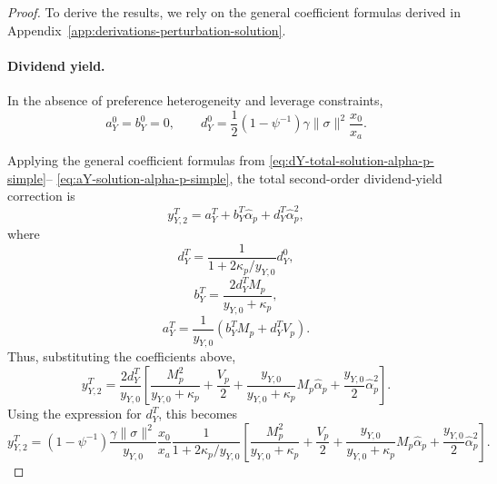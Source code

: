 \begin{proof}
    To derive the results, we rely on the general coefficient formulas derived in Appendix~\ref{app:derivations-perturbation-solution}.
    \paragraph{Dividend yield.}
In the absence of preference heterogeneity and leverage constraints,
\[
a_Y^0=b_Y^0=0,
\qquad
d_Y^0
=
\frac12(1-\psi^{-1})\gamma\|\sigma\|^2\frac{x_0}{x_a}.
\]

Applying the general coefficient formulas from
\eqref{eq:dY-total-solution-alpha-p-simple}--
\eqref{eq:aY-solution-alpha-p-simple},
the total second-order dividend-yield correction is
\[
y_{Y,2}^T
=
a_Y^T+b_Y^T\hat\alpha_p+d_Y^T\hat\alpha_p^2,
\]
where
\[
d_Y^T
=
\frac{1}{1+2\kappa_p/y_{Y,0}}d_Y^0,
\]
\[
b_Y^T
=
\frac{2d_Y^TM_p}{y_{Y,0}+\kappa_p},
\]
\[
a_Y^T
=
\frac{1}{y_{Y,0}}
\left(
b_Y^TM_p+d_Y^TV_p
\right).
\]
Thus, substituting the coefficients above,
\begin{equation}\label{eq:yY2-total-noheterog-closed-form}
    y_{Y,2}^T
    =
    \frac{2d_Y^T}{y_{Y,0}}
    \left[
        \frac{M_p^2}{y_{Y,0}+\kappa_p}
        +\frac{V_p}{2}
        +\frac{y_{Y,0}}{y_{Y,0}+\kappa_p}M_p\hat{\alpha}_p
        +\frac{y_{Y,0}}{2}\hat{\alpha}_p^2
    \right].
\end{equation}
Using the expression for $d_Y^T$, this becomes
\begin{equation}\label{eq:yY2-total-noheterog-primitives}
    y_{Y,2}^T
    =
    \left(1-\psi^{-1}\right)
    \frac{\gamma\|\sigma\|^2}{y_{Y,0}}
    \frac{x_0}{x_a}
    \frac{1}{1+2\kappa_p/y_{Y,0}}
    \left[
        \frac{M_p^2}{y_{Y,0}+\kappa_p}
        +\frac{V_p}{2}
        +\frac{y_{Y,0}}{y_{Y,0}+\kappa_p}M_p\hat{\alpha}_p
        +\frac{y_{Y,0}}{2}\hat{\alpha}_p^2
    \right].
\end{equation}


\end{proof}
